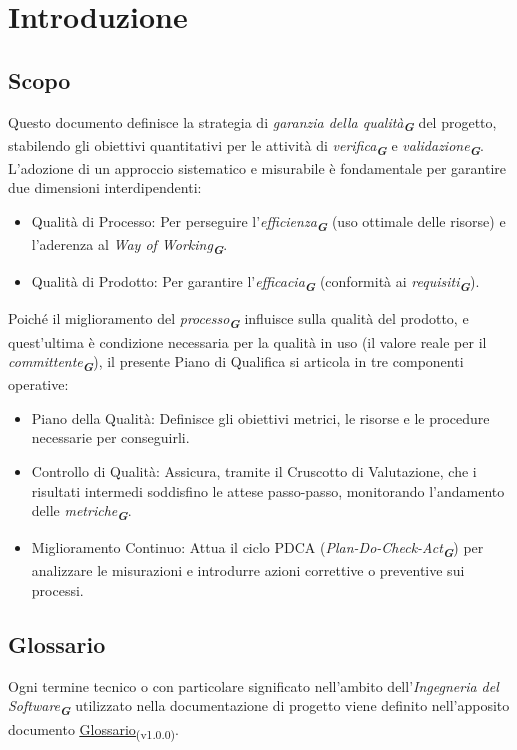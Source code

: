 \documentclass[a4paper,12pt]{article}
\newcommand{\glossario}[1]{\textit{#1}\textsubscript{\textbf{\textit{\textcolor{lightblack}{G}}}}}
\newcommand{\ped}[1]{\textsubscript{#1}}
\begin{document}
\section{Introduzione}

\subsection{Scopo}
Questo documento definisce la strategia di \glossario{garanzia della qualità} del progetto, stabilendo gli obiettivi quantitativi per le attività di \glossario{verifica} e \glossario{validazione}. L'adozione di un approccio sistematico e misurabile è fondamentale per garantire due dimensioni interdipendenti:
\begin{itemize}
    \item Qualità di Processo: Per perseguire l'\glossario{efficienza} (uso ottimale delle risorse) e l'aderenza al \glossario{Way of Working}.
    \item Qualità di Prodotto: Per garantire l'\glossario{efficacia} (conformità ai \glossario{requisiti}).
\end{itemize}

Poiché il miglioramento del \glossario{processo} influisce sulla qualità del prodotto, e quest'ultima è condizione necessaria per la qualità in uso (il valore reale per il \glossario{committente}), il presente Piano di Qualifica si articola in tre componenti operative:
\begin{itemize}
    \item Piano della Qualità: Definisce gli obiettivi metrici, le risorse e le procedure necessarie per conseguirli.
    \item Controllo di Qualità: Assicura, tramite il Cruscotto di Valutazione, che i risultati intermedi soddisfino le attese passo-passo, monitorando l'andamento delle \glossario{metriche}.
    \item Miglioramento Continuo: Attua il ciclo PDCA (\glossario{Plan-Do-Check-Act}) per analizzare le misurazioni e introdurre azioni correttive o preventive sui processi.
\end{itemize}


\subsection{Glossario}
Ogni termine tecnico o con particolare significato nell'ambito dell'\glossario{Ingegneria del Software} utilizzato nella documentazione di progetto viene definito nell'apposito documento \href{https://7-zpus.github.io/Docs/assets/2_RTB/DocumentiInterni/Glossario.pdf}{\ul{Glossario}}\ped{(v1.0.0)}.
\end{document}
